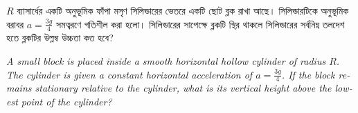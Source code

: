 \documentclass[12pt, a4paper]{article}
\begin{document}
\newpage

\newpage

\begin{tcolorbox}[questionbox={প্রশ্ন (Question) 42}]
    \noindent
    $R$ ব্যাসার্ধের একটি অনুভূমিক ফাঁপা মসৃণ সিলিন্ডারের ভেতরে একটি ছোট ব্লক রাখা আছে। সিলিন্ডারটিকে অনুভূমিক বরাবর $a = \frac{3g}{4}$ সমত্বরণে গতিশীল করা হলো। সিলিন্ডারের সাপেক্ষে ব্লকটি স্থির থাকলে সিলিন্ডারের সর্বনিম্ন তলদেশ হতে ব্লকটির উল্লম্ব উচ্চতা কত হবে?
    
    \vspace{0.8em}
    \begin{english}
    \noindent\textit{\color{darkgray}
    A small block is placed inside a smooth horizontal hollow cylinder of radius $R$. The cylinder is given a constant horizontal acceleration of $a = \frac{3g}{4}$. If the block remains stationary relative to the cylinder, what is its vertical height above the lowest point of the cylinder?
    }
    \end{english}
\end{tcolorbox}
\end{document}
